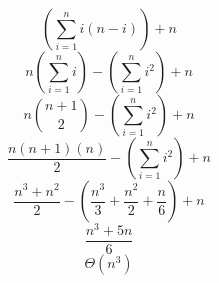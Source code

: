 \documentclass[12pt]{minimal}
\begin{document}
$$(\sum_{i=1}^{n} i(n-i)) + n$$
$$n(\sum_{i=1}^{n} i) - (\sum_{i=1}^{n} i^{2}) + n$$
$$n{n+1 \choose 2} - (\sum_{i=1}^{n} i^{2}) + n$$
$$\frac{n(n+1)(n)}{2} - (\sum_{i=1}^{n} i^{2}) + n$$
$$\frac{n^{3}+n^{2}}{2} - (\frac{n^{3}}{3} + \frac{n^{2}}{2} + \frac{n}{6}) + n$$
$$\frac{n^{3}+5n}{6}$$
$$\Theta(n^{3})$$
\end{document}
